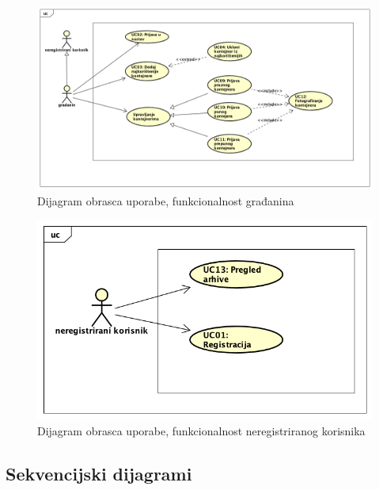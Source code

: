 				\begin{figure}[H]
					\includegraphics[scale=0.4]{figures/pravi_UC_za_gradana.PNG}
					\centering
					\caption{Dijagram obrasca uporabe, funkcionalnost građanina}
					\label{fig:ucgr-diag}
				\end{figure}
			
				

				\begin{figure}[H]
					\includegraphics[scale=0.6]{figures/pravi_UC_za_neregistriranogkorisnika.PNG}
					\centering
					\caption{Dijagram obrasca uporabe, funkcionalnost neregistriranog korisnika}
					\label{fig:ucgr-diag}
				\end{figure}
			
					
					
					
					
						\eject		
				
			\subsection{Sekvencijski dijagrami}
				
